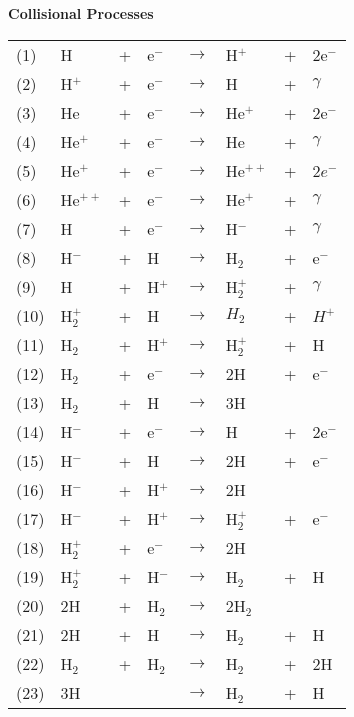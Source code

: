 
\begin{table}
\begin{center}
{\bfseries Collisional Processes}\\[1ex]
\begin{tabular}{llllllll}
(1) & H & + & e$^-$ & $\rightarrow$ & H$^+$ &+& 2e$^-$ \\
(2) & H$^+$ &+ &e$^-$ & $\rightarrow$ & H &+ &$\gamma$ \\
(3) & He &+& e$^-$ & $\rightarrow$ & He$^+$ &+& 2e$^-$  \\
(4) & He$^+$ &+& e$^-$ & $\rightarrow$ & He &+ &$\gamma$  \\
(5) & He$^{+}$ &+& e$^-$ & $\rightarrow$ & He$^{++}$ &+& 2$e^-$  \\
(6) & He$^{++}$ &+& e$^-$ & $\rightarrow$ & He$^+$ &+& $\gamma$ \\
\hline
(7) & H &+& e$^-$ &$\rightarrow$& H$^-$ &+& $\gamma$  \\
(8) & H$^-$ &+& H &$\rightarrow$ & H$_2$ & +& e$^-$ \\
(9) & H &+ &H$^+$ &$\rightarrow$ &H$_2^+$ &+ &$\gamma$ \\
(10) & H$_2^+$ &+ &H &$\rightarrow$ &$H_2$ &+ &$H^+$ \\
(11) & H$_2$ &+ &H$^+$ &$\rightarrow$ &H$_2^+$ & +& H \\
(12) & H$_2$ &+ &e$^-$ & $\rightarrow$ & 2H & + & e$^-$  \\
(13) & H$_2$ & + & H & $\rightarrow$ & 3H &   &      \\
(14) & H$^-$ & + & e$^-$ & $\rightarrow$ & H & + & 2e$^-$ \\
(15) & H$^-$ & + & H & $\rightarrow$ & 2H & + & e$^-$ \\ 
(16) & H$^-$ & + & H$^+$ & $\rightarrow$ & 2H & & \\
(17) & H$^-$ & + & H$^+$ & $\rightarrow$ & H$_2^+$ & + & e$^-$ \\
(18) & H$_2^+$ & + & e$^-$ & $\rightarrow$ & 2H & & \\
(19) & H$_2^+$ & + & H$^-$ & $\rightarrow$ & H$_2$ & + & H  \\
(20) & 2H & + & H$_2$ & $\rightarrow$ & 2H$_2$ &  &   \\
(21) & 2H & + & H & $\rightarrow$ & H$_2$ & + & H  \\
(22) & H$_2$ & + & H$_2$ & $\rightarrow$ & H$_2$ & + & 2H  \\
(23) & 3H & & & $\rightarrow$ & H$_2$ & + & H \\

\end{tabular}
\end{center}
\end{table}
